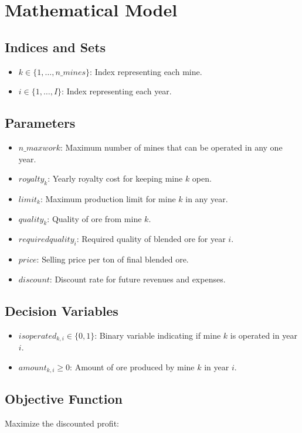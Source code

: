 \documentclass{article}
\begin{document}
\section*{Mathematical Model}

\subsection*{Indices and Sets}
\begin{itemize}
    \item $k \in \{1, \ldots, n\_mines\}$: Index representing each mine.
    \item $i \in \{1, \ldots, I\}$: Index representing each year.
\end{itemize}

\subsection*{Parameters}
\begin{itemize}
    \item $n\_maxwork$: Maximum number of mines that can be operated in any one year.
    \item $royalty_k$: Yearly royalty cost for keeping mine $k$ open.
    \item $limit_k$: Maximum production limit for mine $k$ in any year.
    \item $quality_k$: Quality of ore from mine $k$.
    \item $requiredquality_i$: Required quality of blended ore for year $i$.
    \item $price$: Selling price per ton of final blended ore.
    \item $discount$: Discount rate for future revenues and expenses.
\end{itemize}

\subsection*{Decision Variables}
\begin{itemize}
    \item $isoperated_{k,i} \in \{0, 1\}$: Binary variable indicating if mine $k$ is operated in year $i$.
    \item $amount_{k,i} \geq 0$: Amount of ore produced by mine $k$ in year $i$.
\end{itemize}

\subsection*{Objective Function}
Maximize the discounted profit:
\end{document}
